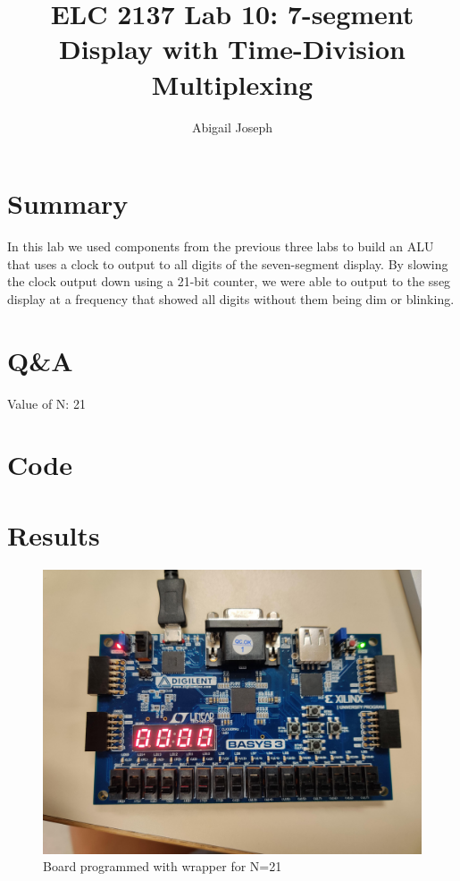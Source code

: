 \documentclass[11pt]{article}
\newcommand{\Verilog}[2][]{%
	
}
\begin{document}
\title{ELC 2137 Lab 10: 7-segment Display with Time-Division
	Multiplexing}
\author{Abigail Joseph}

\maketitle


\section*{Summary}

In this lab we used components from the previous three labs to build an ALU that uses a clock to output to all digits of the seven-segment display. By slowing the clock output down using a 21-bit counter, we were able to output to the sseg display at a frequency that showed all digits without them being dim or blinking.   


\section*{Q\&A}

Value of N: 21

\section*{Code}

\Verilog[firstline=23, caption=Register ,label=code:file_1]{show2c.sv}
\Verilog[firstline=23, caption=Register ,label=code:file_2]{show2c_test.sv}
\Verilog[firstline=23, caption=Register ,label=code:file_3]{ncount.sv}
\Verilog[firstline=23, caption=Register ,label=code:file_4]{ncount_test.sv}
\Verilog[firstline=23, caption=Register ,label=code:file_5]{top_lab10.sv}


\section*{Results}

\begin{figure}[ht]\centering
	\includegraphics[width=.5\textwidth]{wrap_implement}
	\caption{Board programmed with wrapper for N=21}
	\label{fig:wrap_21}			
\end{figure}
\end{document}
